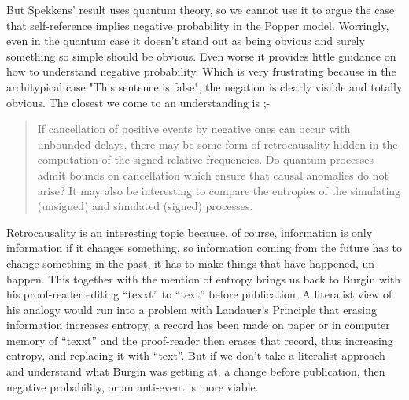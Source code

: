 But Spekkens' result uses quantum theory, so we cannot use it to argue the case that
self-reference implies negative probability in the Popper model. Worringly, even in the quantum
case it doesn't stand out as being obvious and surely something so simple should be obvious. Even
worse it provides little guidance on how to understand negative probability. Which is very
frustrating because in the architypical case "This sentence is false", the negation is clearly
visible and totally obvious. The closest we come to an understanding is ;-
\begin{quotation}
If cancellation of positive events by negative ones can occur with unbounded delays, there may
be some form of retrocausality hidden in the computation of the signed relative frequencies. Do
quantum processes admit bounds on cancellation which ensure that causal anomalies do not arise?
It may also be interesting to compare the entropies of the simulating (unsigned) and simulated
(signed) processes.
 \par
\hfill \autocite{Abramsky2014}
\end{quotation}
Retrocausality is an interesting topic because, of course, information is only information if it
changes something, so information coming from the future has to change something in the past, it
has to make things that have happened, un-happen. This together with the mention of entropy
brings us back to Burgin with his proof-reader editing \enquote{texxt} to \enquote{text} before
publication. A literalist view of his analogy would run into a problem with Landauer's Principle
\autocite{Landauer_1961} that erasing information increases entropy, a record has been made on
paper or in computer memory of \enquote{texxt} and the proof-reader then erases that record,
thus increasing entropy, and replacing it with \enquote{text}. But if we don't take a literalist
approach and understand what Burgin was getting at, a change before publication, then negative
probability, or an anti-event is more viable.
